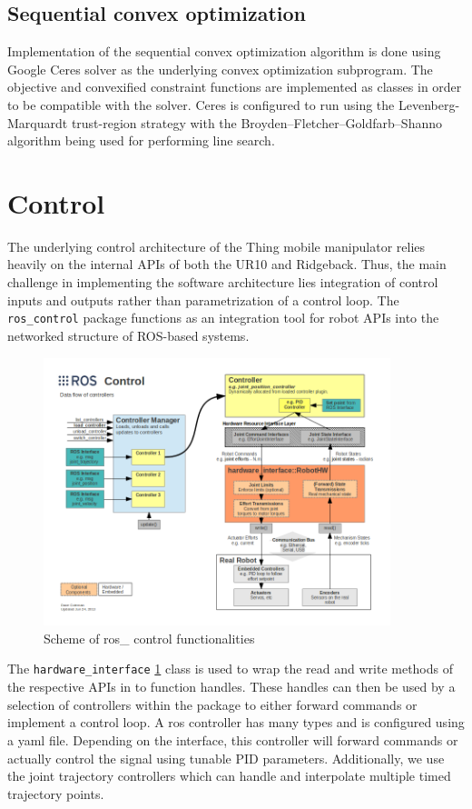 \documentclass[times, utf8, diplomski, english]{fer}
\begin{document}
\subsection{Sequential convex optimization}
Implementation of the sequential convex optimization algorithm is done using Google Ceres solver as the underlying convex optimization subprogram.
The objective and convexified constraint functions are implemented as classes in order to be compatible with the solver.
Ceres is configured to run using the Levenberg-Marquardt trust-region strategy with the Broyden–Fletcher–Goldfarb–Shanno algorithm being used for performing line search.

\section{Control}\label{section:control}
The underlying control architecture of the Thing mobile manipulator relies heavily on the internal APIs of both the UR10 and Ridgeback.
Thus, the main challenge in implementing the software architecture lies integration of control inputs and outputs rather than parametrization of a control loop.
The \verb|ros_control| package functions as an integration tool for robot APIs into the networked structure of ROS-based systems.
\begin{figure}\label{fig:ros control}
\centering
\includegraphics[width=0.9\textwidth]{ros_control}
\caption{Scheme of ros\_ control functionalities}
\end{figure}
The \verb|hardware_interface| \ref{fig:ros control} class is used to wrap the read and write methods of the respective APIs in to function handles. 
These handles can then be used by a selection of controllers within the package to either forward commands or implement a control loop.
A ros controller has many types and is configured using a yaml file. 
Depending on the interface, this controller will forward commands or actually control the signal using tunable PID parameters.
Additionally, we use the joint trajectory controllers which can handle and interpolate multiple timed trajectory points.
\end{document}
